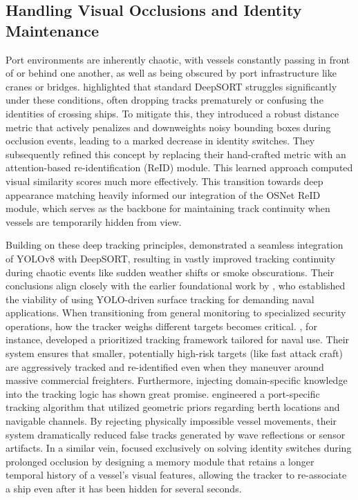 \subsection{Handling Visual Occlusions and Identity Maintenance}
Port environments are inherently chaotic, with vessels constantly passing in front of or behind one another, as well as being obscured by port infrastructure like cranes or bridges. \cite{Belmouhcine2021} highlighted that standard DeepSORT struggles significantly under these conditions, often dropping tracks prematurely or confusing the identities of crossing ships. To mitigate this, they introduced a robust distance metric that actively penalizes and downweights noisy bounding boxes during occlusion events, leading to a marked decrease in identity switches. They subsequently refined this concept \cite{Belmouhcine2022} by replacing their hand-crafted metric with an attention-based re-identification (ReID) module. This learned approach computed visual similarity scores much more effectively. This transition towards deep appearance matching heavily informed our integration of the OSNet ReID module, which serves as the backbone for maintaining track continuity when vessels are temporarily hidden from view.

Building on these deep tracking principles, \cite{Zang2024} demonstrated a seamless integration of YOLOv8 with DeepSORT, resulting in vastly improved tracking continuity during chaotic events like sudden weather shifts or smoke obscurations. Their conclusions align closely with the earlier foundational work by \cite{Zhu2024}, who established the viability of using YOLO-driven surface tracking for demanding naval applications. When transitioning from general monitoring to specialized security operations, how the tracker weighs different targets becomes critical. \cite{Nithya2023}, for instance, developed a prioritized tracking framework tailored for naval use. Their system ensures that smaller, potentially high-risk targets (like fast attack craft) are aggressively tracked and re-identified even when they maneuver around massive commercial freighters. Furthermore, injecting domain-specific knowledge into the tracking logic has shown great promise. \cite{Muslim2025} engineered a port-specific tracking algorithm that utilized geometric priors regarding berth locations and navigable channels. By rejecting physically impossible vessel movements, their system dramatically reduced false tracks generated by wave reflections or sensor artifacts. In a similar vein, \cite{Chen2025} focused exclusively on solving identity switches during prolonged occlusion by designing a memory module that retains a longer temporal history of a vessel's visual features, allowing the tracker to re-associate a ship even after it has been hidden for several seconds.

